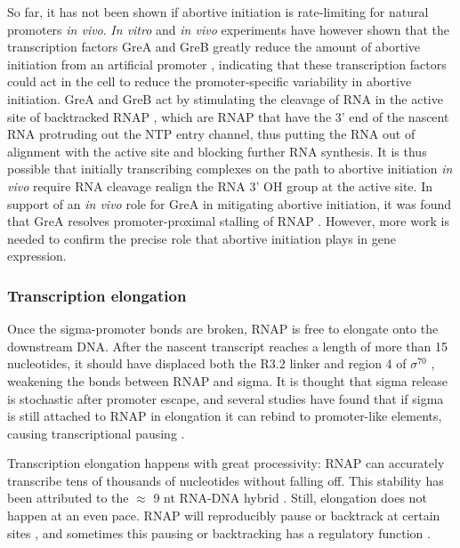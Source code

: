 So far, it has not been shown if abortive initiation is rate-limiting for
natural promoters \textit{in vivo}. \textit{In vitro} and \textit{in vivo}
experiments have however shown that the transcription factors GreA and GreB
greatly reduce the amount of abortive initiation from an artificial promoter
\cite{hsu_escherichia_1995}, indicating that these transcription factors could
act in the cell to reduce the promoter-specific variability in abortive
initiation. GreA and GreB act by stimulating the cleavage of RNA in the active
site of backtracked RNAP \cite{toulme_grea_2000}, which are RNAP that have the
3' end of the nascent RNA protruding out the NTP entry channel, thus putting
the RNA out of alignment with the active site and blocking further RNA
synthesis. It is thus possible that initially transcribing complexes on the
path to abortive initiation \textit{in vivo} require RNA cleavage realign the
RNA 3' OH group at the active site. In support of an \textit{in vivo} role for
GreA in mitigating abortive initiation, it was found that GreA resolves
promoter-proximal stalling of RNAP \cite{kusuya_transcription_2011}. However,
more work is needed to confirm the precise role that abortive initiation plays
in gene expression.

\subsubsection{Transcription elongation}
Once the sigma-promoter bonds are broken, RNAP is free to elongate onto the
downstream DNA. After the nascent transcript reaches a length of more than 15
nucleotides, it should have displaced both the R3.2 linker and region 4 of
$\sigma^{70}$ \cite{mekler_structural_2002, nickels_interaction_2005},
weakening the bonds between RNAP and sigma. It is thought that sigma release is
stochastic after promoter escape, and several studies have found that if sigma
is still attached to RNAP in elongation it can rebind to promoter-like
elements, causing transcriptional pausing \cite{ring_function_1996,
kapanidis_retention_2005, raffaelle_holoenzyme_2005}.

Transcription elongation happens with great processivity: RNAP can accurately
transcribe tens of thousands of nucleotides without falling off. This stability
has been attributed to the $\approx$ 9 nt RNA-DNA hybrid
\cite{nudler_rna-dna_1997}. Still, elongation does not happen at an even pace.
RNAP will reproducibly pause or backtrack at certain sites
\cite{herbert_sequence-resolved_2006} , and sometimes this pausing or
backtracking has a regulatory function \cite{landick_r_regulatory_2006}.

